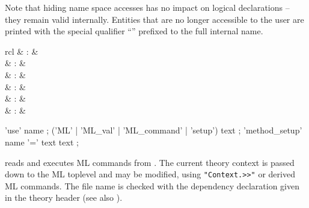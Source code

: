 \begin{isabellebody}
\begin{isamarkuptext}
\begin{descr}
  Note that hiding name space accesses has no impact on logical
  declarations -- they remain valid internally.  Entities that are no
  longer accessible to the user are printed with the special qualifier
  ``\isa{{\isachardoublequote}{\isacharquery}{\isacharquery}{\isachardoublequote}}'' prefixed to the full internal name.

  \end{descr}%
\end{isamarkuptext}%
\isamarkuptrue%
%
\isamarkuptrue%
%
\begin{isamarkuptext}%
\begin{matharray}{rcl}
    \hypertarget{command.use}{\hyperlink{command.use}{\mbox{}}} & : &  \\
    \hypertarget{command.ML}{\hyperlink{command.ML}{\mbox{}}} & : &  \\
    \hypertarget{command.ML-val}{\hyperlink{command.ML-val}{\mbox{}}} & : & \isartrans{\cdot}{\cdot} \\
    \hypertarget{command.ML-command}{\hyperlink{command.ML-command}{\mbox{}}} & : & \isartrans{\cdot}{\cdot} \\
    \hypertarget{command.setup}{\hyperlink{command.setup}{\mbox{}}} & : &  \\
    \hypertarget{command.method-setup}{\hyperlink{command.method-setup}{\mbox{}}} & : &  \\
  \end{matharray}

  \begin{rail}
    'use' name
    ;
    ('ML' | 'ML\_val' | 'ML\_command' | 'setup') text
    ;
    'method\_setup' name '=' text text
    ;
  \end{rail}

  \begin{descr}

  \item [\hyperlink{command.use}{\mbox{\isa{\isacommand{use}}}}~\isa{{\isachardoublequote}file{\isachardoublequote}}] reads and executes ML
  commands from .  The current theory context is passed
  down to the ML toplevel and may be modified, using \verb|"Context.>>"| or derived ML commands.  The file name is checked with
  the \hyperlink{keyword.uses}{\mbox{}} dependency declaration given in the theory
  header (see also ).
  

\end{descr}
\end{isamarkuptext}
\end{isabellebody}
